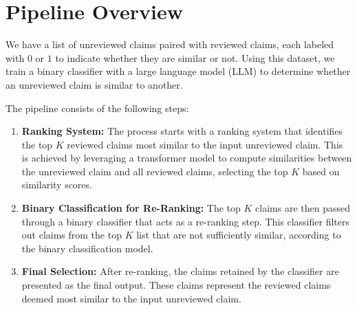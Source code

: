 \documentclass{article}
\begin{document}
\section{Pipeline Overview}
We have a list of unreviewed claims paired with reviewed claims, each labeled with $0$ or $1$ to indicate whether they are similar or not. Using this dataset, we train a binary classifier with a large language model (LLM) to determine whether an unreviewed claim is similar to another.

The pipeline consists of the following steps:
\begin{enumerate}
    \item \textbf{Ranking System:} The process starts with a ranking system that identifies the top $K$ reviewed claims most similar to the input unreviewed claim. This is achieved by leveraging a transformer model to compute similarities between the unreviewed claim and all reviewed claims, selecting the top $K$ based on similarity scores.
    \item \textbf{Binary Classification for Re-Ranking:} The top $K$ claims are then passed through a binary classifier that acts as a re-ranking step. This classifier filters out claims from the top $K$ list that are not sufficiently similar, according to the binary classification model.
    \item \textbf{Final Selection:} After re-ranking, the claims retained by the classifier are presented as the final output. These claims represent the reviewed claims deemed most similar to the input unreviewed claim.
\end{enumerate}



\end{document}
